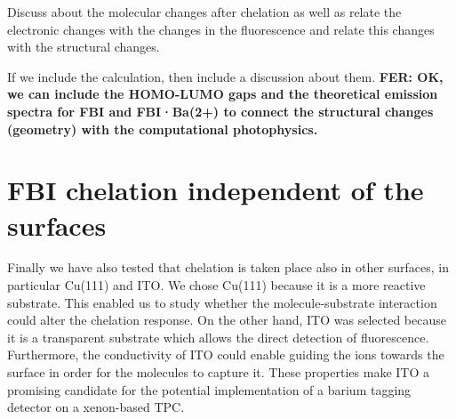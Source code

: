 \documentclass[aps,prl,reprint,longbibliography,superscriptaddress, english]{revtex4-1}
\newcommand{\completar}[1]{{\color{red} #1}}
\begin{document}

\completar{Discuss about the molecular changes after chelation as well as relate the electronic changes with the changes in the fluorescence and relate this changes with the structural changes.} 


\completar{If we include the calculation, then include a discussion about them.\textbf{ FER: OK, we can include the HOMO-LUMO gaps and the theoretical emission spectra for FBI and FBI·Ba(2+) to connect the structural changes (geometry) with the computational photophysics.}}


\section{FBI chelation independent of the surfaces}

Finally we have also tested that chelation is taken place also in other surfaces, in particular Cu(111) and ITO. We chose Cu(111) because it is a more reactive substrate. This enabled us to study whether the molecule-substrate interaction could alter the chelation response. On the other hand, ITO was selected because it is a transparent substrate which allows the direct detection of fluorescence. Furthermore, the conductivity of ITO could enable guiding the \Bapp ions towards the surface in order for the molecules to capture it. These properties make ITO a promising candidate for the potential implementation of a barium tagging detector on a xenon-based TPC\cite{rivilla_fluorescent_2020}.


\end{document}
